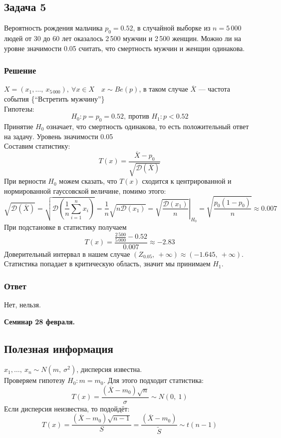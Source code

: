 \documentclass[12pt, a4paper]{article}
\newcommand{\dev}{\mathcal{D}}
\begin{document}
\subsection*{Задача 5}
Вероятность рождения мальчика $p_0 = 0.52$, в случайной выборке из $n = 5\,000$ людей от 30 до 60 лет оказалось 2\,500 мужчин и 2\,500 женщин. Можно ли на уровне значимости 0.05 считать, что смертность мужчин и женщин одинакова.
\subsubsection*{Решение}
$X = (x_1,\dots,\ x_{5\,000}),\ \forall x\in X\quad x\sim Be(p)$, в таком случае $\overline{X}$ --- частота события \{``Встретить мужчину''\}\\
Гипотезы:
\[H_0: p = p_0 = 0.52,\ \text{против } H_1: p < 0.52\]
Принятие $H_0$ означает, что смертность одинакова, то есть положительный ответ на задачу.
Уровень значимости 0.05\\
Составим статистику:
\[T(x) = \frac{\overline{X} - p_0}{\sqrt{\dev\left( \overline{X} \right)}}\]
При верности $H_0$ можем сказать, что $T(x)$ сходится к центрированной и нормированной гауссовской величине, помимо этого:
\[\sqrt{\dev(\overline{X})} = \sqrt{\dev\left( \frac{1}{n}\sum_{i = 1}^{n}x_i \right)} = \frac{1}{n} \sqrt{n\dev(x_1)} = \left.\sqrt{\frac{\dev(x_1)}{n}}\right|_{H_0} = \sqrt{\frac{p_0 (1 - p_0)}{n}} \approx 0.007\]
При подстановке в статистику получаем
\[T(x) = \frac{\frac{2\,500}{5\,000} - 0.52}{0.007} \approx -2.83\]
Доверительный интервал в нашем случае $(Z_{0.05},\ +\infty) \approx (-1.645,\ +\infty)$. Статистика попадает в критическую область, значит мы принимаем $H_1$.
\subsubsection*{Ответ}
Нет, нельзя.
\newpage
\begin{center}
    \bf Семинар 28 февраля.
\end{center}
\subsection*{Полезная информация}
$x_1,\dots,\ x_n \sim N(m,\ \sigma^2)$, дисперсия известна.\\
Проверяем гипотезу $H_0: m = m_0$. Для этого подходит статистика:
\[T(x) = \frac{(\overline{X} - m_0)\sqrt{n}}{\sigma} \sim N(0,\ 1)\]
Если дисперсия неизвестна, то подойдёт:
\[ T(x) = \frac{(\overline{X} - m_0) \sqrt{n - 1}}{S} = \frac{(\overline{X} - m_0)}{\tilde S} \sim t(n - 1)\]
\end{document}
